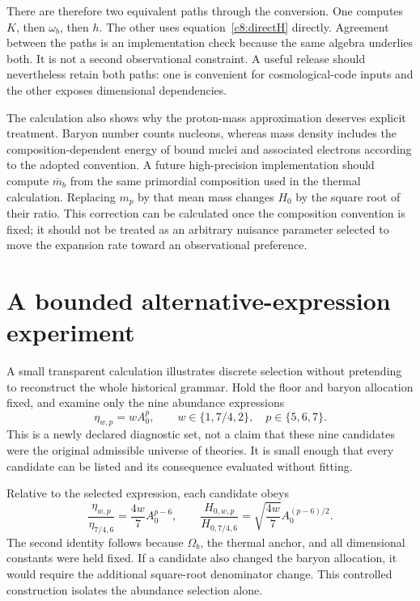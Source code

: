 There are therefore two equivalent paths through the conversion. One computes $K$, then $\omega_b$, then $h$. The other uses equation~\eqref{c8:directH} directly. Agreement between the paths is an implementation check because the same algebra underlies both. It is not a second observational constraint. A useful release should nevertheless retain both paths: one is convenient for cosmological-code inputs and the other exposes dimensional dependencies.

The calculation also shows why the proton-mass approximation deserves explicit treatment. Baryon number counts nucleons, whereas mass density includes the composition-dependent energy of bound nuclei and associated electrons according to the adopted convention. A future high-precision implementation should compute $\overline m_b$ from the same primordial composition used in the thermal calculation. Replacing $m_p$ by that mean mass changes $H_0$ by the square root of their ratio. This correction can be calculated once the composition convention is fixed; it should not be treated as an arbitrary nuisance parameter selected to move the expansion rate toward an observational preference.

\section{A bounded alternative-expression experiment}
A small transparent calculation illustrates discrete selection without pretending to reconstruct the whole historical grammar. Hold the floor and baryon allocation fixed, and examine only the nine abundance expressions
\begin{equation}
 \eta_{w,p}=wA_0^p,\qquad
 w\in\{1,7/4,2\},\quad p\in\{5,6,7\}.
 \label{c8:ninegrammar}
\end{equation}
This is a newly declared diagnostic set, not a claim that these nine candidates were the original admissible universe of theories. It is small enough that every candidate can be listed and its consequence evaluated without fitting.

Relative to the selected expression, each candidate obeys
\begin{equation}
 \frac{\eta_{w,p}}{\eta_{7/4,6}}
 =\frac{4w}{7}A_0^{p-6},\qquad
 \frac{H_{0,w,p}}{H_{0,7/4,6}}
 =\sqrt{\frac{4w}{7}}A_0^{(p-6)/2}.
 \label{c8:nineratios}
\end{equation}
The second identity follows because $\Omega_b$, the thermal anchor, and all dimensional constants were held fixed. If a candidate also changed the baryon allocation, it would require the additional square-root denominator change. This controlled construction isolates the abundance selection alone.

